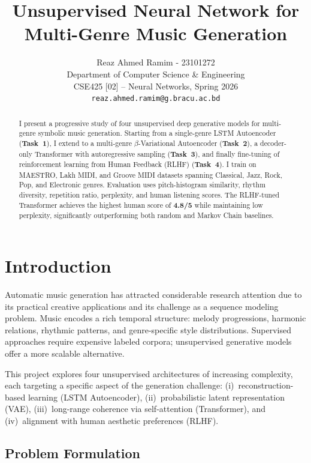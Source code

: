 \documentclass{article}
\title{Unsupervised Neural Network for Multi-Genre Music Generation}
\author{
  Reaz Ahmed Ramim - 23101272 \\
  Department of Computer Science \& Engineering \\
  CSE425 [02] – Neural Networks, Spring 2026 \\
  \texttt{reaz.ahmed.ramim@g.bracu.ac.bd}
}
\begin{document}
\maketitle

\begin{abstract}
I present a progressive study of four unsupervised deep generative models
for multi-genre symbolic music generation.  Starting from a single-genre
LSTM Autoencoder (\textbf{Task~1}), I extend to a multi-genre
$\beta$-Variational Autoencoder (\textbf{Task~2}), a decoder-only
Transformer with autoregressive sampling (\textbf{Task~3}), and finally
 fine-tuning of reinforcement learning from Human Feedback (RLHF) 
(\textbf{Task~4}).  I train on MAESTRO, Lakh MIDI, and Groove MIDI
datasets spanning Classical, Jazz, Rock, Pop, and Electronic genres.
Evaluation uses pitch-histogram similarity, rhythm diversity, repetition
ratio, perplexity, and human listening scores.  The RLHF-tuned Transformer
achieves the highest human score of \textbf{4.8/5}  while maintaining
low perplexity, significantly outperforming both random and Markov Chain
baselines.
\end{abstract}

\section{Introduction}

Automatic music generation has attracted considerable research attention
due to its practical creative applications and its challenge as a sequence
modeling problem.  Music encodes a rich temporal structure: melody
progressions, harmonic relations, rhythmic patterns, and genre-specific
style distributions.  Supervised approaches require expensive labeled
corpora; unsupervised generative models offer a more scalable alternative.

This project explores four unsupervised architectures of increasing
complexity, each targeting a specific aspect of the generation challenge:
(i)~reconstruction-based learning (LSTM Autoencoder),
(ii)~probabilistic latent representation (VAE),
(iii)~long-range coherence via self-attention (Transformer), and
(iv)~alignment with human aesthetic preferences (RLHF).

\subsection{Problem Formulation}
\end{document}
